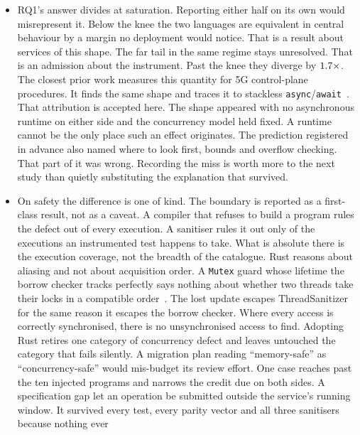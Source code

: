 \documentclass[english,twoside,openright,a4paper,censored,csm,software-track-2020]{HYthesisML}
\begin{document}
\begin{itemize}
  \item RQ1's answer divides at saturation. Reporting either half on its own would
        misrepresent it. Below the knee the two languages are equivalent in central behaviour by
        a margin no deployment would notice. That is a result about services of this shape. The
        far tail in the same regime stays unresolved. That is an admission about the instrument.
        Past the knee they diverge by $1.7\times$. The closest prior work measures
        this quantity for 5G control-plane procedures. It finds the same shape and traces it to
        stackless \texttt{async}/\texttt{await}~\cite{arvidsson2025async}. That attribution is
        accepted here. The shape appeared with no asynchronous runtime on either side and the
        concurrency model held fixed. A runtime cannot be the only place such an effect
        originates. The prediction registered in advance also named where to look first, bounds
        and overflow checking. That part of it was wrong. Recording the miss is worth more to
        the next study than quietly substituting the explanation that survived.
  \item On safety the difference is one of kind. The boundary is reported as a first-class
        result, not as a caveat. A compiler that refuses to build a program rules the defect out
        of every execution. A sanitiser rules it out only of the executions an instrumented test
        happens to take. What is absolute there is the execution coverage, not the breadth of
        the catalogue. Rust reasons about aliasing and not about acquisition order. A
        \texttt{Mutex} guard whose lifetime the borrow checker tracks perfectly says nothing
        about whether two threads take their locks in a compatible
        order~\cite{zhang2026deadlock}. The lost update escapes ThreadSanitizer for the same
        reason it escapes the borrow checker. Where every access is correctly synchronised, there
        is no unsynchronised access to find. Adopting Rust retires one category of concurrency
        defect and leaves untouched the category that fails silently. A migration plan reading
        ``memory-safe'' as ``concurrency-safe'' would mis-budget its review effort. One case
        reaches past the ten injected programs and narrows the credit due on both sides. A
        specification gap let an operation be submitted outside the service's running window. It
        survived every test, every parity vector and all three sanitisers because nothing ever

\end{itemize}
\end{document}
